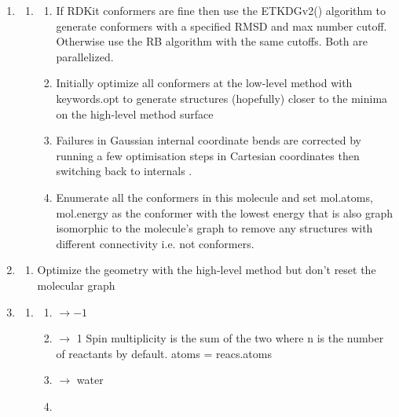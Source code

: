\documentclass[../../main.tex]{subfiles}
\begin{document}
\begin{enumerate}
	\item  {}
	
	\begin{enumerate}
		\item {}
	
		\begin{enumerate}
			\item {}
			If RDKit conformers are fine then use the
			ETKDGv2() algorithm to generate 
			conformers with a specified RMSD and
			max number cutoff. Otherwise use the RB
			algorithm with the same cutoffs. Both 
			are parallelized.
			
			\item {}
			Initially optimize all conformers at the
			low-level method with keywords.opt to
			generate structures (hopefully) closer to
			the minima on the high-level method 
			surface
			
			\item {}
			Failures in Gaussian internal coordinate
			bends are corrected by running a few
			optimisation steps in Cartesian
			coordinates then switching back to
			internals .
			
			\item {}
			Enumerate all the conformers in this
			molecule and set mol.atoms, mol.energy
			as the conformer with the lowest energy
			that is also graph isomorphic to the
			molecule’s graph to remove any 
			structures with different connectivity i.e.
			not conformers.
		\end{enumerate}
	\end{enumerate}
	
	\item {}
	\begin{enumerate}
		\item {}
		Optimize the geometry with the high-level method
		but don’t reset the molecular graph
	\end{enumerate}
	
	\item {}
	
	\begin{enumerate}
		\item {}
		\begin{enumerate}
			\item {} $\rightarrow -1$
			\item {} $\rightarrow$ 1
			Spin multiplicity is the sum of the two where n is 
			the number of reactants by default.
			atoms = reacs.atoms
			\item {} $\rightarrow$ water
			\item {}
		\end{enumerate}
		

\end{enumerate}
\end{enumerate}
\end{document}
